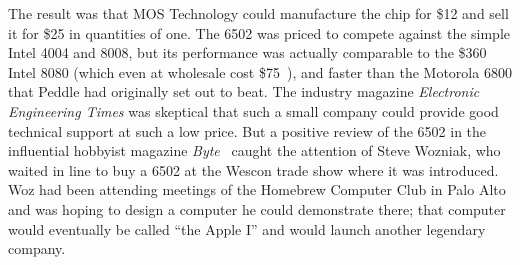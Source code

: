The result was that MOS Technology could manufacture the chip for \$12
and sell it for \$25 in  quantities of one.  The 6502 was priced to
compete against
the simple Intel 4004 and 8008, but its performance was actually
comparable to  the \$360
Intel 8080 (which even at wholesale cost \$75~\cite[p. 228]{ceruzzi}),
and faster than the Motorola 6800 that Peddle had originally set out to beat.
The industry magazine \emph{Electronic
  Engineering Times} was skeptical that such a small company could provide good
technical support at such a low price. 
But a positive review of the 6502 in the influential
hobbyist magazine \emph{Byte}~\cite{byte75:6502} caught the attention of
Steve Wozniak, who waited in line  to buy
a 6502 at the Wescon trade show where it was introduced. 
Woz had been attending meetings of the 
Homebrew Computer Club in Palo Alto and was hoping to design a computer
he could demonstrate there; that computer would eventually be called
``the Apple I'' and would launch another legendary company.




